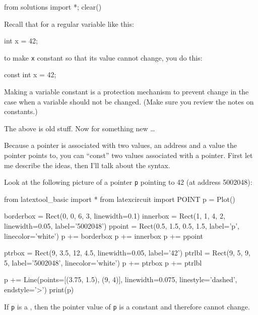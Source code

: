 \begin{python0}
from solutions import *; clear()
\end{python0}

Recall that for a regular variable like this:

\begin{consolethree}[escapeinside=||]
int x = 42;
\end{consolethree}

to make \texttt{x} constant so that its value cannot change, you do this:

\begin{consolethree}[escapeinside=||]
const int x = 42;
\end{consolethree}

Making a variable constant is a protection mechanism to prevent change in the case when a variable should not be changed. (Make sure you review the notes on constants.)

The above is old stuff. Now for something new \ldots{}

Because a pointer is associated with two values, an address and a value the pointer points to, you can ``const'' two values associated with a pointer. First let me describe the ideas, then I'll talk about the syntax.

Look at the following picture of a pointer \texttt{p} pointing to 42 (at address 5002048):

\begin{python}
from latextool_basic import *
from latexcircuit import POINT
p = Plot()

borderbox = Rect(0, 0, 6, 3, linewidth=0.1)
innerbox = Rect(1, 1, 4, 2, linewidth=0.05, label='5002048')
ppoint = Rect(0.5, 1.5, 0.5, 1.5, label='p', linecolor='white')
p += borderbox
p += innerbox
p += ppoint

ptrbox = Rect(9, 3.5, 12, 4.5, linewidth=0.05, label='42')
ptrlbl = Rect(9, 5, 9, 5, label='5002048', linecolor='white')
p += ptrbox
p += ptrlbl

p += Line(points=[(3.75, 1.5), (9, 4)], linewidth=0.075, linestyle='dashed', endstyle='>')
print(p)
\end{python}

If \texttt{p} is a , then the pointer value of \texttt{p} is a constant and therefore cannot change.

